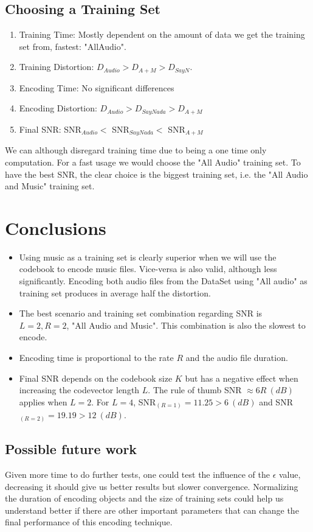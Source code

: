 \documentclass[a4paper, 11pt]{article}
\begin{document}
		\subsection{Choosing a Training Set}
			\begin{enumerate}
				\item Training Time: Mostly dependent on the amount of data we get the training set from, fastest: "AllAudio".
				\item Training Distortion: $ D_{Audio}> D_{A+M} > D_{SayN} $.
				\item Encoding Time: No significant differences
				\item Encoding Distortion: $  D_{Audio} > D_{SayNada} > D_{A+M} $
				\item Final SNR: SNR$_{Audio} <$ SNR$_{SayNada} <$ SNR$_{A+M} $
			\end{enumerate}
			
			We can although disregard training time due to being a one time only computation.
			For a fast usage we would choose the "All Audio" training set.
			To have the best SNR, the clear choice is the biggest training set, i.e. the "All Audio and Music" training set.
				
	
	\section{Conclusions}
		\begin{itemize}
			\item Using music as a training set is clearly superior when we will use the codebook to encode music files. Vice-versa is also valid, although less significantly. Encoding both audio files from the DataSet using "All audio" as training set produces in average half the distortion.
			\item The best scenario and training set combination regarding SNR is $ L=2, R=2 $, "All Audio and Music". This combination is also the slowest to encode.
			\item Encoding time is proportional to the rate $R$ and the audio file duration.
			\item Final SNR depends on the codebook size $  K $ but has a negative effect when increasing the codevector length $ L $. The rule of thumb SNR $\approx 6 R  \ (dB)$ applies when $ L =2 $. For $ L=4 $, SNR$_{(R=1)} = 11.25 > 6 \ (dB) $ and SNR$_{(R=2)} = 19.19 > 12 \ (dB)$.
		\end{itemize}
		
		\subsection{Possible future work}
			Given more time to do further tests, one could test the influence of the $ \epsilon $ value, decreasing it should give us better results but slower convergence. 
			Normalizing the duration of encoding objects and the size of training sets could help us understand better if there are other important parameters that can change the final performance of this encoding technique.
		
\end{document}

